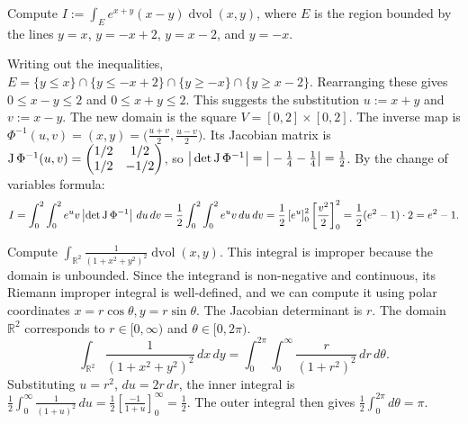 \begin{example}
\label{ex:change_of_variables_diamond}
Compute $I := \int_E e^{x+y}(x-y) \mathop{d\text{vol}}(x,y)$, where $E$ is the region bounded by the lines $y=x$, $y=-x+2$, $y=x-2$, and $y=-x$.

Writing out the inequalities, $E = \{ y \leq x \} \cap \{ y \leq -x+2 \} \cap \{ y \geq -x \} \cap \{ y \geq x-2 \}$.
Rearranging these gives $0 \leq x-y \leq 2$ and $0 \leq x+y \leq 2$.
This suggests the substitution $u := x+y$ and $v := x-y$. The new domain is the square $V = [0,2] \times [0,2]$.
The inverse map is $\Phi^{-1}(u,v) = (x,y) = \big(\frac{u+v}{2}, \frac{u-v}{2}\big)$.
Its Jacobian matrix is $\operatorname{J}\Phi^{-1}(u,v) = \begin{pmatrix} 1/2 & 1/2 \\ 1/2 & -1/2 \end{pmatrix}$, so $\big|\det\operatorname{J}\Phi^{-1}\big| = \big|-\frac{1}{4} - \frac{1}{4}\big| = \frac{1}{2}$.
By the change of variables formula:
\[I = \int_0^2 \int_0^2 e^u v \left|\det\operatorname{J}\Phi^{-1}\right| \,du\,dv = \frac{1}{2} \int_0^2 \int_0^2 e^u v \,du\,dv = \frac{1}{2} \left[ e^u \right]_0^2 \left[ \frac{v^2}{2} \right]_0^2 = \frac{1}{2} (e^2-1) \cdot 2 = e^2-1.\]
\end{example}

\begin{example}
\label{ex:improper_integral_polar}
Compute $\int_{\mathbb{R}^2} \frac{1}{(1+x^2+y^2)^2} \mathop{d\text{vol}}(x,y)$.
This integral is improper because the domain is unbounded. Since the integrand is non-negative and continuous, its Riemann improper integral is well-defined, and we can compute it using polar coordinates $x = r\cos\theta, y = r\sin\theta$.
The Jacobian determinant is $r$. The domain $\mathbb{R}^2$ corresponds to $r \in [0, \infty)$ and $\theta \in [0, 2\pi)$.
\[
\int_{\mathbb{R}^2} \frac{1}{(1+x^2+y^2)^2} \,dx\,dy
= \int_0^{2\pi} \int_0^\infty \frac{r}{(1+r^2)^2} \,dr\,d\theta.
\]
Substituting $u = r^2$, $du = 2r\,dr$, the inner integral is $\frac{1}{2} \int_0^\infty \frac{1}{(1+u)^2} \,du = \frac{1}{2} \left[ \frac{-1}{1+u} \right]_0^\infty = \frac{1}{2}$.
The outer integral then gives $\frac{1}{2} \int_0^{2\pi} d\theta = \pi$.
\end{example}

